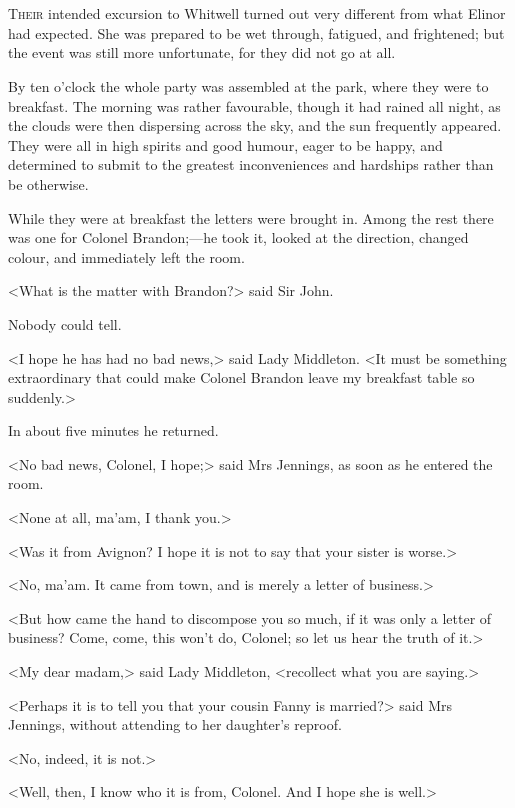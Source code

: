 \chapter[Chapter \thechapter]{}
\lettrine[lraise=0.3]{T}{heir} intended excursion to Whitwell turned out very different from what Elinor had expected. She was prepared to be wet through, fatigued, and frightened; but the event was still more unfortunate, for they did not go at all.

By ten o'clock the whole party was assembled at the park, where they were to breakfast. The morning was rather favourable, though it had rained all night, as the clouds were then dispersing across the sky, and the sun frequently appeared. They were all in high spirits and good humour, eager to be happy, and determined to submit to the greatest inconveniences and hardships rather than be otherwise.

While they were at breakfast the letters were brought in. Among the rest there was one for Colonel Brandon;—he took it, looked at the direction, changed colour, and immediately left the room.

<What is the matter with Brandon?> said Sir John.

Nobody could tell.

<I hope he has had no bad news,> said Lady Middleton. <It must be something extraordinary that could make Colonel Brandon leave my breakfast table so suddenly.>

In about five minutes he returned.

<No bad news, Colonel, I hope;> said Mrs Jennings, as soon as he entered the room.

<None at all, ma'am, I thank you.>

<Was it from Avignon? I hope it is not to say that your sister is worse.>

<No, ma'am. It came from town, and is merely a letter of business.>

<But how came the hand to discompose you so much, if it was only a letter of business? Come, come, this won't do, Colonel; so let us hear the truth of it.>

<My dear madam,> said Lady Middleton, <recollect what you are saying.>

<Perhaps it is to tell you that your cousin Fanny is married?> said Mrs Jennings, without attending to her daughter's reproof.

<No, indeed, it is not.>

<Well, then, I know who it is from, Colonel. And I hope she is well.>

